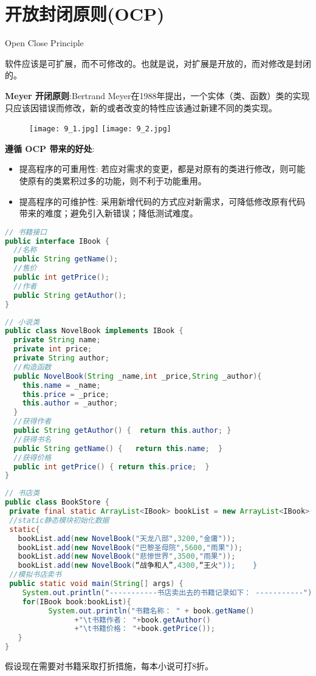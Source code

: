 \documentclass[../main.tex]{subfiles}
\begin{document}
\section{开放封闭原则(OCP)}
Open Close Principle

软件应该是可扩展，而不可修改的。也就是说，对扩展是开放的，而对修改是封闭的。

\textbf{Meyer 开闭原则}:Bertrand Meyer在1988年提出，一个实体（类、函数）类的实现只应该因错误而修改，新的或者改变的特性应该通过新建不同的类实现。
\begin{figure}[H]
  \texttt{[image: 9\_1.jpg]}
  \texttt{[image: 9\_2.jpg]}
\end{figure}
\textbf{遵循 OCP 带来的好处}:
\begin{itemize}
  \item 提高程序的可重用性:
    若应对需求的变更，都是对原有的类进行修改，则可能使原有的类累积过多的功能，则不利于功能重用。
  \item 提高程序的可维护性:
    采用新增代码的方式应对新需求，可降低修改原有代码带来的难度；避免引入新错误；降低测试难度。
\end{itemize}
\begin{lstlisting}[language=java]
// 书籍接口
public interface IBook {
  //名称
  public String getName();
  //售价
  public int getPrice();
  //作者
  public String getAuthor();
}
\end{lstlisting}
\begin{lstlisting}[language=java]
// 小说类
public class NovelBook implements IBook {
  private String name;
  private int price;
  private String author;
  //构造函数
  public NovelBook(String _name,int _price,String _author){
    this.name = _name;
    this.price = _price;
    this.author = _author;
  }
  //获得作者
  public String getAuthor() {  return this.author; }
  //获得书名
  public String getName() {   return this.name;  }
  //获得价格
  public int getPrice() { return this.price;  }
}
\end{lstlisting}
\begin{lstlisting}[language=java]
// 书店类
public class BookStore {
 private final static ArrayList<IBook> bookList = new ArrayList<IBook>();
 //static静态模块初始化数据
 static{
   bookList.add(new NovelBook("天龙八部",3200,"金庸"));
   bookList.add(new NovelBook("巴黎圣母院",5600,"雨果"));
   bookList.add(new NovelBook("悲惨世界",3500,"雨果"));
   bookList.add(new NovelBook(“战争和人”,4300,“王火"));    }
 //模拟书店卖书
 public static void main(String[] args) {
    System.out.println("-----------书店卖出去的书籍记录如下： -----------");
    for(IBook book:bookList){
          System.out.println("书籍名称： " + book.getName()
                +"\t书籍作者： "+book.getAuthor()
                +"\t书籍价格： "+book.getPrice());
   }
}
\end{lstlisting}
假设现在需要对书籍采取打折措施，每本小说可打8折。
\end{document}
